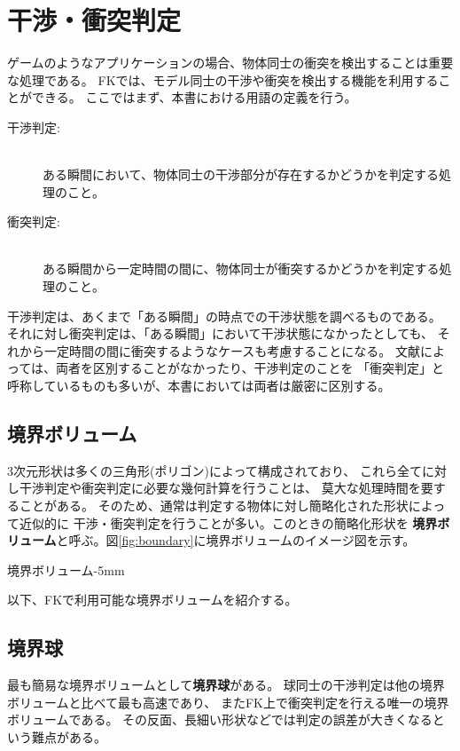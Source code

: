 \section{干渉・衝突判定}
ゲームのようなアプリケーションの場合、物体同士の衝突を検出することは重要な処理である。
FKでは、モデル同士の干渉や衝突を検出する機能を利用することができる。
ここではまず、本書における用語の定義を行う。
\begin{description}
 \item[干渉判定:] ~ \\
	ある瞬間において、物体同士の干渉部分が存在するかどうかを判定する処理のこと。

 \item[衝突判定:] ~ \\
	ある瞬間から一定時間の間に、物体同士が衝突するかどうかを判定する処理のこと。
\end{description}

干渉判定は、あくまで「ある瞬間」の時点での干渉状態を調べるものである。
それに対し衝突判定は、「ある瞬間」において干渉状態になかったとしても、
それから一定時間の間に衝突するようなケースも考慮することになる。
文献によっては、両者を区別することがなかったり、干渉判定のことを
「衝突判定」と呼称しているものも多いが、本書においては両者は厳密に区別する。

\subsection{境界ボリューム}
3次元形状は多くの三角形(ポリゴン)によって構成されており、
これら全てに対し干渉判定や衝突判定に必要な幾何計算を行うことは、
莫大な処理時間を要することがある。
そのため、通常は判定する物体に対し簡略化された形状によって近似的に
干渉・衝突判定を行うことが多い。このときの簡略化形状を
\textbf{境界ボリューム}と呼ぶ。図\ref{fig:boundary}に境界ボリュームのイメージ図を示す。

	{境界ボリューム}{-5mm}

以下、FKで利用可能な境界ボリュームを紹介する。

\subsection{境界球}
最も簡易な境界ボリュームとして\textbf{境界球}がある。
球同士の干渉判定は他の境界ボリュームと比べて最も高速であり、
またFK上で衝突判定を行える唯一の境界ボリュームである。
その反面、長細い形状などでは判定の誤差が大きくなるという難点がある。


